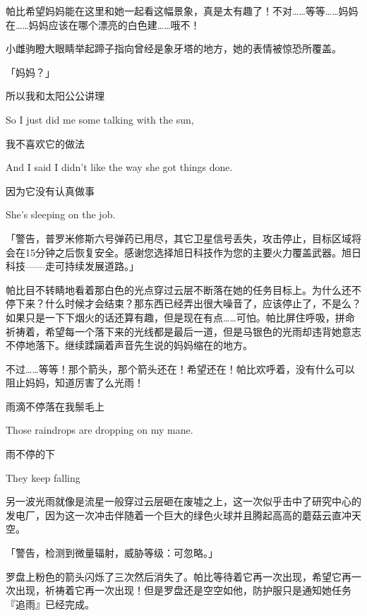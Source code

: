 帕比希望妈妈能在这里和她一起看这幅景象，真是太有趣了！不对……等等……妈妈在……妈妈应该在哪个漂亮的白色建……哦不！

小雌驹瞪大眼睛举起蹄子指向曾经是象牙塔的地方，她的表情被惊恐所覆盖。

「妈妈？」


\begin{song}
    所以我和太阳公公讲理
    
    So I just did me some talking with the sun,
    
    \medskip

    我不喜欢它的做法
    
    And I said I didn't like the way she got things done.
    
    \medskip

    因为它没有认真做事
    
    She's sleeping on the job.
\end{song}

「警告，普罗米修斯六号弹药已用尽，其它卫星信号丢失，攻击停止，目标区域将会在15分钟之后恢复安全。感谢您选择旭日科技作为您的主要火力覆盖武器。旭日科技——走可持续发展道路。」

帕比目不转睛地看着那白色的光点穿过云层不断落在她的任务目标上。为什么还不停下来？什么时候才会结束？那东西已经弄出很大噪音了，应该停止了，不是么？如果只是一下下烟火的话还算有趣，但是现在有点……可怕。帕比屏住呼吸，拼命祈祷着，希望每一个落下来的光线都是最后一道，但是马银色的光雨却违背她意志不停地落下。继续蹂躏着声音先生说的妈妈缩在的地方。

不过……等等！那个箭头，那个箭头还在！希望还在！帕比欢呼着，没有什么可以阻止妈妈，知道厉害了么光雨！


\begin{song}
    雨滴不停落在我鬃毛上
    
    Those raindrops are dropping on my mane.
    
    \medskip

    雨不停的下
    
    They keep falling
\end{song}

另一波光雨就像是流星一般穿过云层砸在废墟之上，这一次似乎击中了研究中心的发电厂，因为这一次冲击伴随着一个巨大的绿色火球并且腾起高高的蘑菇云直冲天空。

「{\mt 警告，检测到微量辐射，威胁等级：可忽略。}」

罗盘上粉色的箭头闪烁了三次然后消失了。帕比等待着它再一次出现，希望它再一次出现，祈祷着它再一次出现！但是罗盘还是空空如他，防护服只是通知她任务『追雨』已经完成。


